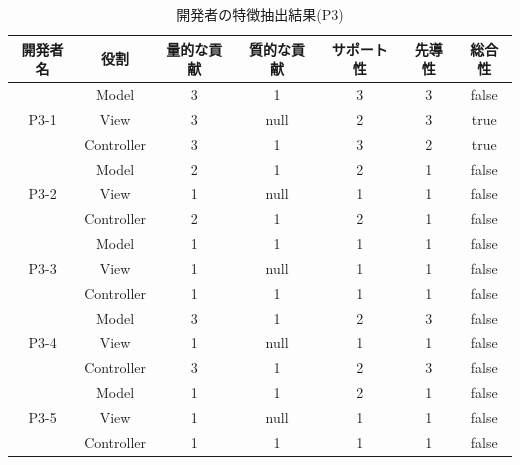 \documentclass{funthesis}
\begin{document}
\begin{table}[htb]
  \begin{center}
\begin{tabular}{|c|c|c|c|c|c|c|}
\hline
開発者名 & 役割 & 量的な貢献 & 質的な貢献 & サポート性 & 先導性 & 総合性\\ \hline

& Model & 3 & 1 & 3 & 3 & false\\ \cline{2-7}
P3-1 & View & 3 & null & 2 & 3 & true\\ \cline{2-7}
& Controller & 3 & 1 & 3 & 2 & true \\ \hline \hline

& Model & 2 & 1 & 2 & 1 & false\\ \cline{2-7}
P3-2 & View & 1 & null & 1 & 1 & false\\ \cline{2-7}
& Controller & 2 & 1 & 2 & 1 & false \\ \hline \hline

& Model & 1 & 1 & 1 & 1 & false\\ \cline{2-7}
P3-3 & View & 1 & null & 1 & 1 & false\\ \cline{2-7}
& Controller & 1 & 1 & 1 & 1 & false \\ \hline \hline

& Model & 3 & 1 & 2 & 3 & false\\ \cline{2-7}
P3-4 & View & 1 & null& 1 & 1 & false\\ \cline{2-7}
& Controller & 3 & 1 & 2 & 3 & false \\ \hline \hline

& Model & 1 & 1 & 2 & 1 & false\\ \cline{2-7}
P3-5 & View & 1 & null & 1 & 1 & false\\ \cline{2-7}
& Controller & 1 & 1 & 1 & 1 & false \\ \hline
\end{tabular}
  \end{center}
  \caption{開発者の特徴抽出結果(P3)}    \label{sample}
\end{table}
\end{document}
